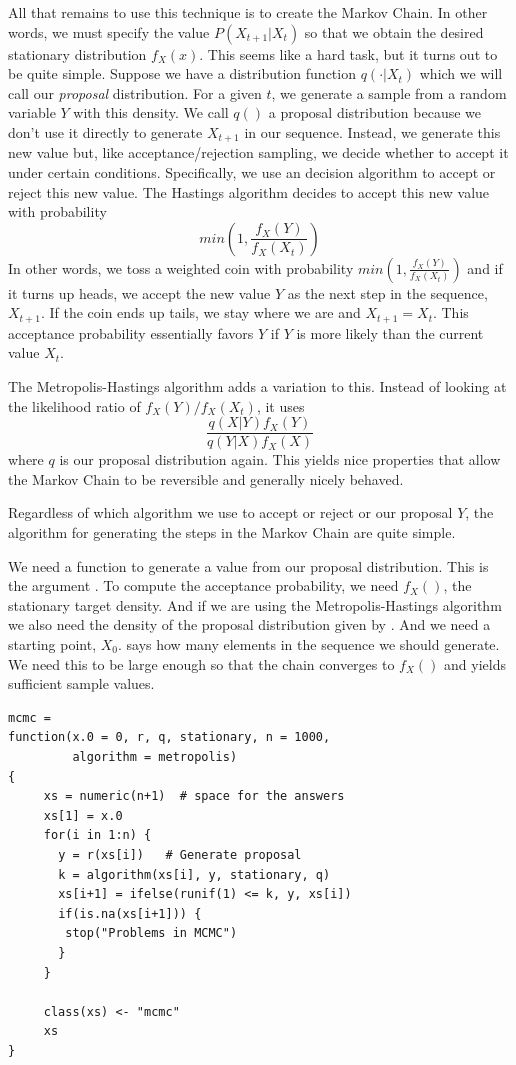 All that remains to use this technique is to create the Markov Chain.
In other words, we must specify the value $P(X_{t+1} \vert X_t)$ so
that we obtain the desired stationary distribution $f_X(x)$.  This
seems like a hard task, but it turns out to be quite simple.  Suppose
we have a distribution function $q(\cdot \vert X_t)$ which we will
call our \textit{proposal} distribution.  For a given $t$, we generate
a sample from a random variable $Y$ with this density.  We call $q()$
a proposal distribution because we don't use it directly to generate
$X_{t+1}$ in our sequence. Instead, we generate this new value but,
like acceptance/rejection sampling, we decide whether to accept it
under certain conditions.  Specifically, we use an decision algorithm
to accept or reject this new value.
The Hastings algorithm decides to accept this new value
with probability
$$
 min(1, \frac{f_X(Y)}{f_X(X_t)})
 $$ In other words, we toss a weighted coin with probability $ min(1,
 \frac{f_X(Y)}{f_X(X_t)})$ and if it turns up heads, we accept the new
 value $Y$ as the next step in the sequence, $X_{t+1}$.  If the coin
 ends up tails, we stay where we are and $X_{t+1} = X_t$.  This
 acceptance probability essentially favors $Y$ if $Y$ is more likely
 than the current value $X_{t}$.

The Metropolis-Hastings algorithm adds a variation to this.
Instead of looking at the likelihood ratio of $f_X(Y)/f_X(X_t)$,
it uses
$$
 \frac{q(X\vert Y) f_X(Y)}{q(Y\vert X) f_X(X)}
 $$ 
where $q$ is our proposal distribution again.
This yields nice properties that allow the Markov Chain to be
reversible and generally nicely behaved.

Regardless of which algorithm we use to accept or reject or our
proposal $Y$, the algorithm for generating the steps in the Markov
Chain are quite simple.

We need a function to generate a value from our proposal distribution.
This is the argument .  To compute the acceptance probability,
we need $f_X()$, the stationary target density.  And if we are using
the Metropolis-Hastings algorithm we also need the density of the
proposal distribution given by .  And we need a starting
point, $X_0$.   says how many elements in the sequence we
should generate.  We need this to be large enough so that the chain
converges to $f_X()$ and yields sufficient sample values.
\begin{verbatim}
mcmc =
function(x.0 = 0, r, q, stationary, n = 1000, 
         algorithm = metropolis)
{
     xs = numeric(n+1)  # space for the answers
     xs[1] = x.0
     for(i in 1:n) {
       y = r(xs[i])   # Generate proposal
       k = algorithm(xs[i], y, stationary, q)
       xs[i+1] = ifelse(runif(1) <= k, y, xs[i])
       if(is.na(xs[i+1])) {
        stop("Problems in MCMC")
       }
     }

     class(xs) <- "mcmc"
     xs
}
\end{verbatim}


